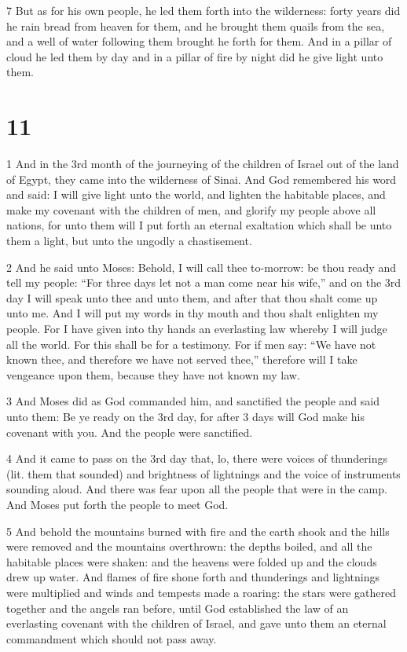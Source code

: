 \par 7 But as for his own people, he led them forth into the wilderness: forty years did he rain bread from heaven for them, and he brought them quails from the sea, and a well of water following them brought he forth for them. And in a pillar of cloud he led them by day and in a pillar of fire by night did he give light unto them.

\chapter{11}

\par 1 And in the 3rd month of the journeying of the children of Israel out of the land of Egypt, they came into the wilderness of Sinai. And God remembered his word and said: I will give light unto the world, and lighten the habitable places, and make my covenant with the children of men, and glorify my people above all nations, for unto them will I put forth an eternal exaltation which shall be unto them a light, but unto the ungodly a chastisement. 

\par 2 And he said unto Moses: Behold, I will call thee to-morrow: be thou ready and tell my people: “For three days let not a man come near his wife,” and on the 3rd day I will speak unto thee and unto them, and after that thou shalt come up unto me. And I will put my words in thy mouth and thou shalt enlighten my people. For I have given into thy hands an everlasting law whereby I will judge all the world. For this shall be for a testimony. For if men say: “We have not known thee, and therefore we have not served thee,” therefore will I take vengeance upon them, because they have not known my law.

\par 3 And Moses did as God commanded him, and sanctified the people and said unto them: Be ye ready on the 3rd day, for after 3 days will God make his covenant with you. And the people were sanctified. 

\par 4 And it came to pass on the 3rd day that, lo, there were voices of thunderings (lit. them that sounded) and brightness of lightnings and the voice of instruments sounding aloud. And there was fear upon all the people that were in the camp. And Moses put forth the people to meet God. 

\par 5 And behold the mountains burned with fire and the earth shook and the hills were removed and the mountains overthrown: the depths boiled, and all the habitable places were shaken: and the heavens were folded up and the clouds drew up water. And flames of fire shone forth and thunderings and lightnings were multiplied and winds and tempests made a roaring: the stars were gathered together and the angels ran before, until God established the law of an everlasting covenant with the children of Israel, and gave unto them an eternal commandment which should not pass away.

